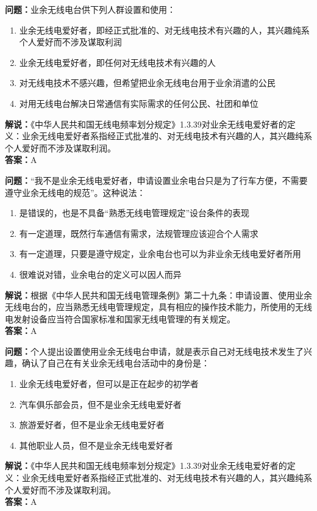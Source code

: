 \documentclass[UTF8]{ctexbook}
\begin{document}
\textbf{问题：}业余无线电台供下列人群设置和使用：
\begin{enumerate}[label=\Alph*), leftmargin=3em]
  \item 业余无线电爱好者，即经正式批准的、对无线电技术有兴趣的人，其兴趣纯系个人爱好而不涉及谋取利润
  \item 业余无线电爱好者，即任何对无线电技术有兴趣的人
  \item 对无线电技术不感兴趣，但希望把业余无线电台用于业余消遣的公民
  \item 对用无线电台解决日常通信有实际需求的任何公民、社团和单位
\end{enumerate}
\textbf{解说：}《中华人民共和国无线电频率划分规定》1.3.39对业余无线电爱好者的定义：业余无线电爱好者系指经正式批准的、对无线电技术有兴趣的人，其兴趣纯系个人爱好而不涉及谋取利润。\\
\textbf{答案：}A

\textbf{问题：}“我不是业余无线电爱好者，申请设置业余电台只是为了行车方便，不需要遵守业余无线电的规范”。这种说法：
\begin{enumerate}[label=\Alph*), leftmargin=3em]
  \item 是错误的，也是不具备“熟悉无线电管理规定”设台条件的表现
  \item 有一定道理，既然行车通信有需求，法规管理应该迎合个人需求
  \item 有一定道理，只要是遵守规定，业余电台也可以为非业余无线电爱好者所用
  \item 很难说对错，业余电台的定义可以因人而异
\end{enumerate}
\textbf{解说：}根据《中华人民共和国无线电管理条例》第二十九条：申请设置、使用业余无线电台的，应当熟悉无线电管理规定，具有相应的操作技术能力，所使用的无线电发射设备应当符合国家标准和国家无线电管理的有关规定。\\
\textbf{答案：}A

\textbf{问题：}个人提出设置使用业余无线电台申请，就是表示自己对无线电技术发生了兴趣，确认了自己在有关业余无线电台活动中的身份是：
\begin{enumerate}[label=\Alph*), leftmargin=3em]
  \item 业余无线电爱好者，但可以是正在起步的初学者
  \item 汽车俱乐部会员，但不是业余无线电爱好者
  \item 旅游爱好者，但不是业余无线电爱好者
  \item 其他职业人员，但不是业余无线电爱好者
\end{enumerate}
\textbf{解说：}《中华人民共和国无线电频率划分规定》1.3.39对业余无线电爱好者的定义：业余无线电爱好者系指经正式批准的、对无线电技术有兴趣的人，其兴趣纯系个人爱好而不涉及谋取利润。\\
\textbf{答案：}A
\end{document}
